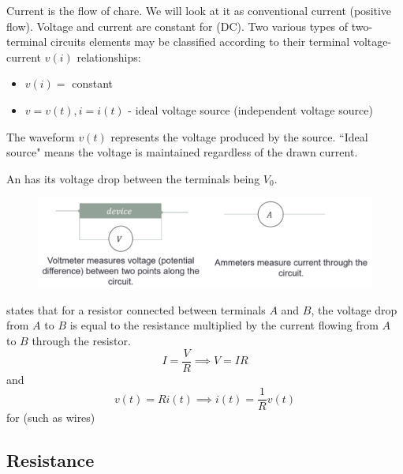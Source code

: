 \documentclass[12pt, a4paper, oneside, openright, titlepage]{book}
\begin{document}
Current is the flow of chare. We will look at it as conventional current (positive flow). Voltage and current are constant for  (DC). Two various types of two-terminal circuits elements may be classified according to their terminal voltage-current $v(i)$ relationships: \begin{itemize}
    \item $v(i) = $ constant
    \item $v = v(t), i = i(t)$ - ideal voltage source (independent voltage source)
\end{itemize}

\begin{defn}
    The waveform $v(t)$ represents the voltage produced by the source. ``Ideal source" means the voltage is maintained regardless of the drawn current.
\end{defn}

\begin{defn}
    An  has its voltage drop between the terminals being $V_0$.
\end{defn}

\begin{figure}[H]
    \centering
    \includegraphics[scale = 0.8]{Images/TH1.PNG}
\end{figure}

\begin{defn}
     states that for a resistor connected between terminals $A$ and $B$, the voltage drop from $A$ to $B$ is equal to the resistance multiplied by the current flowing from $A$ to $B$ through the resistor. \begin{equation*}
        I = \frac{V}{R}\implies V = IR
    \end{equation*}
    and \begin{equation*}
        v(t) = Ri(t)\implies i(t) = \frac{1}{R}v(t)
    \end{equation*}
    for  (such as wires)
\end{defn}

\subsection{Resistance}
\end{document}
